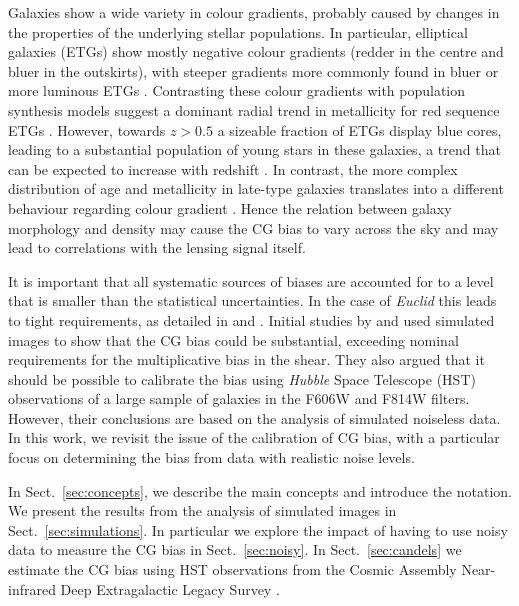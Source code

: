 \documentclass[useAMS,usenatbib]{mnras}
\begin{document}
Galaxies show a wide variety in colour gradients, probably caused by changes in the properties
of the underlying stellar populations. In particular, elliptical galaxies (ETGs) show mostly 
negative colour gradients (redder in the centre and bluer in the outskirts), with steeper gradients more commonly found in bluer or more luminous ETGs \citep[e.g.][]{2005ApJ...635..243F, 2011MNRAS.414.3052D, 2011MNRAS.411.1151G}. Contrasting these colour gradients with population 
synthesis models suggest a dominant radial trend in metallicity for red sequence ETGs 
\citep[e.g.][]{2011ApJ...740L..41L,2016A&A...593A..84K}. However, towards $z>0.5$ a sizeable
fraction of ETGs display blue cores, leading to a substantial population of young stars in these
galaxies, a trend that can be expected to increase with redshift \citep{2009MNRAS.395..554F, 2010ApJS..187..374S}. In contrast, the more complex distribution of age and metallicity in 
late-type galaxies translates into a different behaviour regarding colour gradient \citep{2005ApJ...630..784T}. Hence the relation between galaxy morphology and density may cause the CG bias to vary across the sky and may lead to correlations with the lensing signal itself.

It is important that all systematic sources of biases are accounted for to a level that is smaller than the
statistical uncertainties. In the case of {\it Euclid} this leads to tight requirements, as detailed in
\cite{Massey13} and \cite{Cropper13}. Initial studies by \cite{Voigt12} and  used simulated images to show that the CG bias could be substantial,
exceeding nominal requirements for the multiplicative bias in the shear. They also argued
that it should be possible to calibrate the bias using {\it Hubble} Space Telescope (HST) observations
of a large sample of galaxies in the F606W and F814W filters. However, their conclusions are based on the analysis of simulated noiseless data. In this work, we revisit the issue of the calibration of CG bias,
with a particular focus on determining the bias from data with realistic noise levels.

In Sect.~\ref{sec:concepts}, we describe the main concepts and introduce the notation. We present the results from the analysis of simulated images in Sect.~\ref{sec:simulations}. In particular we explore the  impact of having to use noisy data to measure the CG bias in Sect.~\ref{sec:noisy}.
In Sect.~\ref{sec:candels} we estimate the CG bias using HST observations from the Cosmic Assembly Near-infrared Deep Extragalactic Legacy Survey \citep[CANDELS;][]{Koekemoer11}.
\end{document}
